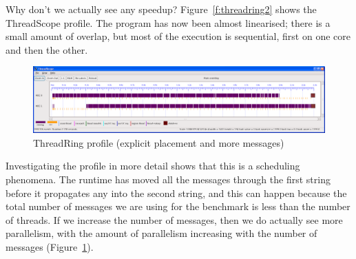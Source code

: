 Why don't we actually see any speedup?
Figure~\ref{f:threadring2} shows the ThreadScope profile.
The program has now been almost linearised; there is a small amount of
overlap, but most of the execution is sequential, first on one core
and then the other.

\begin{figure}
\begin{center}
\includegraphics[scale=0.3]{threadring3.png}
\end{center}
\caption{ThreadRing profile (explicit placement and more messages)}
\label{f:threadring3}
\end{figure}

Investigating the profile in more detail shows that this is a
scheduling phenomena.  The runtime has moved all the messages through
the first string before it propagates any into the second string, and
this can happen because the total number of messages we are using for
the benchmark is less than the number of threads.  If we increase the
number of messages, then we do actually see more parallelism, with the
amount of parallelism increasing with the number of messages
(Figure~\ref{f:threadring3}).
